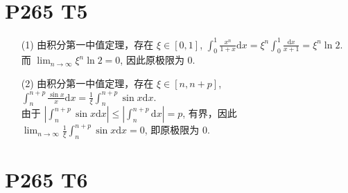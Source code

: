 \documentclass{article}
\newcommand{\dd}{\mathrm{d}}
\newcommand{\dx}{\dd x}
\begin{document}
\section*{P265 T5}

\begin{itemize}
    \item [(1)] 由积分第一中值定理，存在 $\xi \in [0, 1]$, $\int_{0}^{1}\frac{x^n}{1 + x}\dx = \xi^n \int_{0}^{1}\frac{\dx}{x + 1} = \xi^n \ln 2$. 而 $\lim_{n \to \infty}\xi^n \ln 2 = 0$, 因此原极限为 $0$.
    \item [(2)] 由积分第一中值定理，存在 $\xi \in [n, n + p]$, $\int_{n}^{n + p}\frac{\sin x}{x}\dx = \frac{1}{\xi}\int_{n}^{n + p}\sin x \dx$.  \\
    由于 $\left\lvert \int_{n}^{n + p}\sin x \dx\right\rvert \leqslant \left\lvert \int_{n}^{n + p}\dx\right\rvert = p$, 有界，因此 $\lim_{n \to \infty}\frac{1}{\xi}\int_{n}^{n + p}\sin x \dx = 0$, 即原极限为 $0$.
\end{itemize}

\section*{P265 T6}
\end{document}
